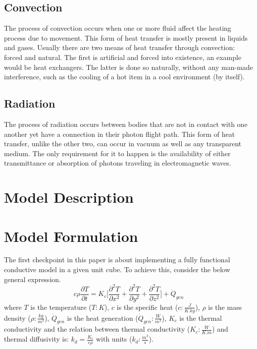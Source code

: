 \documentclass[a4paper,10pt]{IEEEtran}
\begin{document}
	\subsection{Convection}
	The process of convection occurs when one or more fluid affect the heating process due to movement. This form of heat transfer is mostly present in liquids and gases. Usually there are two means of heat transfer through convection: forced and natural. The first is artificial and forced into existence, an example would be heat exchangers. The latter is done so naturally, without any man-made interference, such as the cooling of a hot item in a cool environment (by itself). 
	\subsection{Radiation}
	The process of radiation occurs between bodies that are not in contact with one another yet have a connection in their photon flight path. This form of heat transfer, unlike the other two, can occur in vacuum as well as any transparent medium. The only requirement for it to happen is the availability of either transmittance or absorption of photons traveling in electromagnetic waves. 
	
	
	
	\section{Model Description}
	
	\section{Model Formulation}
	The first checkpoint in this paper is about implementing a fully functional conductive model in a given unit cube. To achieve this, consider the below general expression.
	\begin{equation}
		c\rho\frac{\partial T}{\partial t} = K_c \Bigg[ \frac{\partial^2 T}{\partial x^2} + \frac{\partial^2 T}{\partial y^2} + \frac{\partial^2 T}{\partial z^2} \Bigg] + \dot{Q}_{gen}
	\end{equation}
	where $T$ is the temperature ($T: K$), $c$ is the specific heat ($c: \frac{J}{K.kg}$), $\rho$ is the mass density ($\rho: \frac{kg}{m^3}$), $\dot{Q}_{gen}$ is the heat generation ($\dot{Q}_{gen}: \frac{W}{m^3}$), $K_c$ is the thermal conductivity and the relation between thermal conductivity ($K_c: \frac{W}{K.m}$) and thermal diffusivity is: $k_d = \frac{K_c}{c\rho}$ with units ($k_d: \frac{m^2}{s}$).
	
\end{document}
